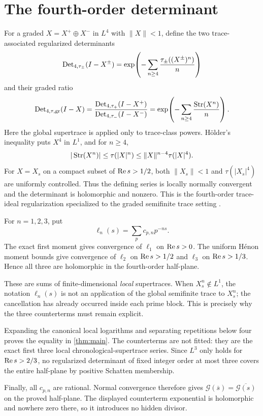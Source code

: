 \section{The fourth-order determinant}

For a graded $X=X^+\oplus X^-$ in $L^4$ with $\|X\|<1$, define the two
trace-associated regularized determinants
\[
 \operatorname{Det}_{4,\tau_\pm}(I-X^\pm)
 =\exp\!\left(-\sum_{n\ge4}
       \frac{\tau_\pm((X^\pm)^n)}n\right)
\]
and their graded ratio
\[
 \operatorname{Det}_{4,\tau,\mathrm{gr}}(I-X)
 =\frac{\operatorname{Det}_{4,\tau_+}(I-X^+)}
        {\operatorname{Det}_{4,\tau_-}(I-X^-)}
 =\exp\!\left(-\sum_{n\ge4}\frac{\operatorname{Str}(X^n)}n\right).
\]
Here the global supertrace is applied only to trace-class powers.  H\"older's
inequality puts $X^4$ in $L^1$, and for $n\ge4$,
\[
 |\operatorname{Str}(X^n)|\le\tau(|X|^n)
 \le\|X\|^{n-4}\tau(|X|^4).
\]
For $X=X_s$ on a compact subset of $\operatorname{Re} s>1/2$, both $\|X_s\|<1$ and
$\tau(|X_s|^4)$ are uniformly controlled.  Thus the defining series is
locally normally convergent and the determinant is holomorphic and nonzero.
This is the fourth-order trace-ideal regularization specialized to the graded
semifinite trace setting \cite{Simon2005}.

For $n=1,2,3$, put
\[
 \ell_n(s)=\sum_pc_{p,n}p^{-ns}.
\]
The exact first moment gives convergence of $\ell_1$ on $\operatorname{Re} s>0$.
The uniform H\'enon moment bounds give convergence of $\ell_2$ on
$\operatorname{Re} s>1/2$ and $\ell_3$ on $\operatorname{Re} s>1/3$.  Hence all three are
holomorphic in the fourth-order half-plane.

These are sums of finite-dimensional \emph{local} supertraces.  When
$X_s^n\notin L^1$, the notation $\ell_n(s)$ is not an application of the
global semifinite trace to $X_s^n$; the cancellation has already occurred
inside each prime block.  This is precisely why the three counterterms must
remain explicit.

Expanding the canonical local logarithms and separating repetitions below
four proves the equality in \cref{thm:main}.  The counterterms are not fitted:
they are the exact first three local chronological-supertrace series.  Since
$L^3$ only holds for $\operatorname{Re} s>2/3$, no regularized determinant of fixed
integer order at most three covers the entire half-plane by positive Schatten
membership.

Finally, all $c_{p,n}$ are rational.  Normal convergence therefore gives
$\mathcal G(\overline s)=\overline{\mathcal G(s)}$ on the proved half-plane.
The displayed counterterm exponential is holomorphic and nowhere zero there,
so it introduces no hidden divisor.
